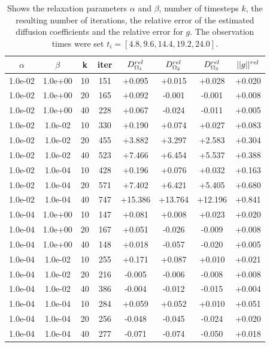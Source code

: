 \documentclass[12pt,a4paper]{article}
\begin{document}
\begin{table}
\centering
\caption{ Shows the relaxation parameters $\alpha$ and $\beta$, number of timesteps $k$, the resulting number of iterations, the relative error of the estimated diffusion coefficients and the relative error for $g$. The observation times were set $t_i = [ 4.8, 9.6, 14.4, 19.2, 24.0 ] $. }
\begin{tabular}{*{8}c}
$\alpha$ & $\beta$ & k & iter & $ D_{\Omega_1}\sp{rel}$& $D_{\Omega_2}\sp{rel} $ & $D_{\Omega_3}\sp{rel} $& $||g||\sp{rel} $ \\
\hline
 1.0e-02 	 & 1.0e+00 	 & 10 & 151 	 & +0.095 & +0.015 & +0.028 & +0.020 \\ 
 1.0e-02 	 & 1.0e+00 	 & 20 & 165 	 & +0.092 & -0.001 & -0.001 & +0.008 \\ 
 1.0e-02 	 & 1.0e+00 	 & 40 & 228 	 & +0.067 & -0.024 & -0.011 & +0.005 \\ 
 
 1.0e-02 	 & 1.0e-02 	 & 10 & 330 	 & +0.190 & +0.074 & +0.027 & +0.083 \\ 
 1.0e-02 	 & 1.0e-02 	 & 20 & 455 	 & +3.882 & +3.297 & +2.583 & +0.304 \\ 
  1.0e-02 	 & 1.0e-02 	 & 40 & 523 	 & +7.466 & +6.454 & +5.537 & +0.388 \\ 

 1.0e-02 	 & 1.0e-04 	 & 10 & 428 	 & +0.196 & +0.076 & +0.032 & +0.163 \\ 
 1.0e-02 	 & 1.0e-04 	 & 20 & 571 	 & +7.402 & +6.421 & +5.405 & +0.680 \\ 
 1.0e-02 	 & 1.0e-04 	 & 40 & 747 	 & +15.386 & +13.764 & +12.196 & +0.841 \\ 
  
  1.0e-04 	 & 1.0e+00 	 & 10 & 147 	 & +0.081 & +0.008 & +0.023 & +0.020 \\ 
  1.0e-04 	 & 1.0e+00 	 & 20 & 167 	 & +0.051 & -0.026 & -0.009 & +0.008 \\ 
  1.0e-04 	 & 1.0e+00 	 & 40 & 148 	 & +0.018 & -0.057 & -0.020 & +0.005 \\ 
  
 1.0e-04 	 & 1.0e-02 	 & 10 & 255 	 & +0.171 & +0.087 & +0.010 & +0.021 \\ 
 1.0e-04 	 & 1.0e-02 	 & 20 & 216 	 & -0.005 & -0.006 & -0.008 & +0.008 \\ 
 1.0e-04 	 & 1.0e-02 	 & 40 & 386 	 & -0.004 & -0.012 & -0.015 & +0.004 \\ 
  
  
 1.0e-04 	 & 1.0e-04 	 & 10 & 284 	 & +0.059 & +0.052 & +0.010 & +0.051 \\ 
 1.0e-04 	 & 1.0e-04 	 & 20 & 256 	 & -0.048 & -0.045 & -0.024 & +0.020 \\ 
  1.0e-04 	 & 1.0e-04 	 & 40 & 277 	 & -0.071 & -0.074 & -0.050 & +0.018 \\ 
  

\end{tabular}
\end{table}
\end{document}
